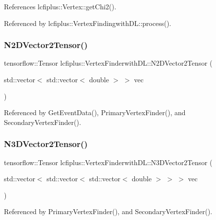 References lcfiplus\+::\+Vertex\+::get\+Chi2().



Referenced by lcfiplus\+::\+Vertex\+Findingwith\+D\+L\+::process().

\mbox{\label{namespacelcfiplus_1_1VertexFinderwithDL_aeab304ede69e16f9e8a0f14d2dbd870b}} 
\subsubsection{N2\+D\+Vector2\+Tensor()}
{\footnotesize\ttfamily tensorflow\+::\+Tensor lcfiplus\+::\+Vertex\+Finderwith\+D\+L\+::\+N2\+D\+Vector2\+Tensor (\begin{DoxyParamCaption}\item[{std\+::vector$<$ std\+::vector$<$ double $>$ $>$}]{vec }\end{DoxyParamCaption})}



Referenced by Get\+Event\+Data(), Primary\+Vertex\+Finder(), and Secondary\+Vertex\+Finder().

\mbox{\label{namespacelcfiplus_1_1VertexFinderwithDL_aa777b46a86b96d0ff9ff607c027430dc}} 
\subsubsection{N3\+D\+Vector2\+Tensor()}
{\footnotesize\ttfamily tensorflow\+::\+Tensor lcfiplus\+::\+Vertex\+Finderwith\+D\+L\+::\+N3\+D\+Vector2\+Tensor (\begin{DoxyParamCaption}\item[{std\+::vector$<$ std\+::vector$<$ std\+::vector$<$ double $>$ $>$ $>$}]{vec }\end{DoxyParamCaption})}



Referenced by Primary\+Vertex\+Finder(), and Secondary\+Vertex\+Finder().

\mbox{\label{namespacelcfiplus_1_1VertexFinderwithDL_ab11f2f72f8dcd9a7e8965a901bbed1f4}} 

